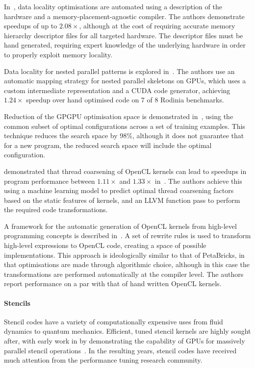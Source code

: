 In~\cite{Chen2014}, data locality optimisations are automated using a description of the hardware and a memory-placement-agnostic compiler. The authors demonstrate speedups of up to $2.08\times$, although at the cost of requiring accurate memory hierarchy descriptor files for all targeted hardware. The descriptor files must be hand generated, requiring expert knowledge of the underlying hardware in order to properly exploit memory locality.

Data locality for nested parallel patterns is explored in~\cite{Lee}. The authors use an automatic mapping strategy for nested parallel skeletons on GPUs, which uses a custom intermediate representation and a CUDA code generator, achieving $1.24\times$ speedup over hand optimised code on 7 of 8 Rodinia benchmarks.

Reduction of the GPGPU optimisation space is demonstrated in~\cite{Ryoo2008}, using the common subset of optimal configurations across a set of training examples. This technique reduces the search space by 98\%, although it does not guarantee that for a new program, the reduced search space will include the optimal configuration.

\citeauthor{Magni2014} demonstrated that thread coarsening of OpenCL kernels can lead to speedups in program performance between $1.11\times$ and $1.33\times$ in~\cite{Magni2014}. The authors achieve this using a machine learning model to predict optimal thread coarsening factors based on the static features of kernels, and an LLVM function pass to perform the required code transformations.

A framework for the automatic generation of OpenCL kernels from high-level programming concepts is described in~\cite{Steuwer2015}. A set of rewrite rules is used to transform high-level expressions to OpenCL code, creating a space of possible implementations. This approach is ideologically similar to that of PetaBricks, in that optimisations are made through algorithmic choice, although in this case the transformations are performed automatically at the compiler level. The authors report performance on a par with that of hand written OpenCL kernels.

\paragraph{Stencils} Stencil codes have a variety of computationally expensive uses from fluid dynamics to quantum mechanics. Efficient, tuned stencil kernels are highly sought after, with early work in \citeyear{Bolz2003} by \citeauthor{Bolz2003} demonstrating the capability of GPUs for massively parallel stencil operations~\cite{Bolz2003}. In the resulting years, stencil codes have received much attention from the performance tuning research community.

